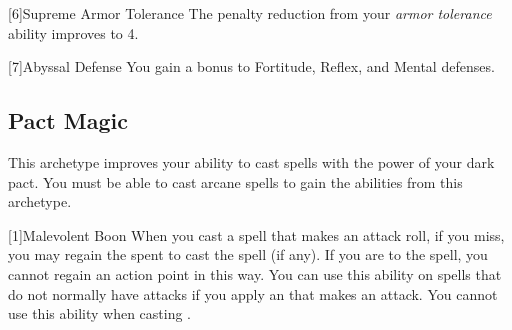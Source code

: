         [6]{Supreme Armor Tolerance} The penalty reduction from your \textit{armor tolerance} ability improves to 4.

        [7]{Abyssal Defense} You gain a  bonus to Fortitude, Reflex, and Mental defenses.

    \subsection{Pact Magic}
        This archetype improves your ability to cast spells with the power of your dark pact.
        You must be able to cast arcane spells to gain the abilities from this archetype.

        [1]{Malevolent Boon}
        When you cast a spell that makes an attack roll, if you miss, you may regain the  spent to cast the spell (if any).
        If you are  to the spell, you cannot regain an action point in this way.
        You can use this ability on spells that do not normally have attacks if you apply an  that makes an attack.
        You cannot use this ability when casting .

